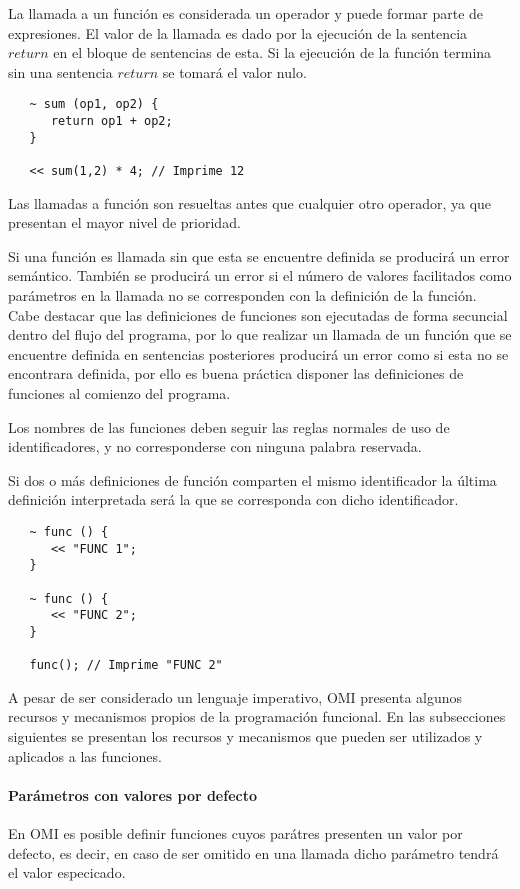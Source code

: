 La llamada a un función es considerada un operador y puede formar parte de expresiones. El
valor de la llamada es dado por la ejecución de la sentencia $return$ en el bloque de sentencias
de esta. Si la ejecución de la función termina sin una sentencia $return$ se tomará el valor nulo. \\

\begin{lstlisting}
   ~ sum (op1, op2) { 
      return op1 + op2;
   }
   
   << sum(1,2) * 4; // Imprime 12
\end{lstlisting} 

Las llamadas a función son resueltas antes que cualquier otro operador, ya que presentan el mayor nivel de prioridad. 

Si una función es llamada sin que esta se encuentre definida se producirá un error semántico. También se producirá 
un error si el número de valores facilitados como parámetros en la llamada no se corresponden con la definición de la función. Cabe destacar 
que las definiciones de funciones son ejecutadas de forma secuncial dentro del flujo del programa, por lo que realizar 
un llamada de un función que se encuentre definida en sentencias posteriores producirá un error como si esta no
se encontrara definida, por ello es buena práctica disponer las definiciones de funciones al comienzo del programa.

Los nombres de las funciones deben seguir las reglas normales de uso de identificadores, y no corresponderse con ninguna
palabra reservada.

Si dos o más definiciones de función comparten el mismo identificador la última definición interpretada será la que se corresponda
con dicho identificador. \\

\begin{lstlisting}
   ~ func () { 
      << "FUNC 1";
   }
   
   ~ func () { 
      << "FUNC 2";
   }
   
   func(); // Imprime "FUNC 2"
\end{lstlisting} 

A pesar de ser considerado un lenguaje imperativo, OMI presenta algunos recursos y mecanismos propios de la programación funcional. En las 
subsecciones siguientes se presentan los recursos y mecanismos que pueden ser utilizados y aplicados a las funciones. 

\paragraph{Parámetros con valores por defecto}
En OMI es posible definir funciones cuyos parátres presenten un valor por defecto, es decir, en caso de ser omitido en una llamada
dicho parámetro tendrá el valor especicado. 

